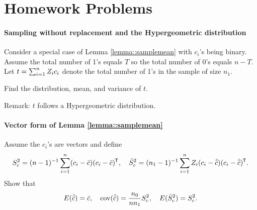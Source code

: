 \section{Homework Problems}

\paragraph{Sampling without replacement and the Hypergeometric distribution}
\label{problem::srs-hypergeometric}


Consider a special case of Lemma \ref{lemma::samplemean} with $c_i$'s being binary. Assume the total number of 1's equals $T$ so the total number of 0's equals $n-T$. Let $t = \sum_{i=1}^n Z_i c_i$ denote the total number of 1's in the sample of size $n_1$. 

Find the distribution, mean, and variance of $t$. 

Remark: $t$ follows a Hypergeometric distribution.  



\paragraph{Vector form of Lemma \ref{lemma::samplemean}}
\label{para::srs-vector-form}


Assume the $c_i$'s are vectors and define 
$$
S_c^2 = (n-1)^{-1} \sum_{i=1}^n (c_i  - \bar{c})(c_i -  \bar{c}) ^{\mkern-1.5mu\mathsf{T}} ,\quad
\hat S_c^2 = (n_1-1)^{-1} \sum_{i=1}^n Z_i (c_i  - \hat{\bar{c}})(c_i - \hat{\bar{c}}) ^{\mkern-1.5mu\mathsf{T}} .
$$
Show that 
$$
E(\hat{\bar{c}}) = \bar c,\quad
\textup{cov}( \hat{\bar{c}} ) = \frac{n_0}{ nn_1} S_c^2,\quad
E(\hat S_c^2 ) = S_c^2 .
$$



